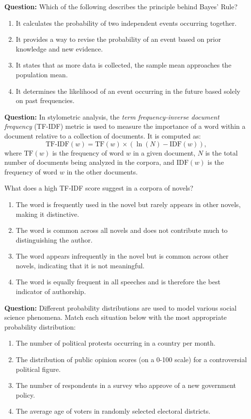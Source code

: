\documentclass[12pt]{article}
\begin{document}
\textbf{Question:}  
Which of the following describes the principle behind Bayes’ Rule?  
\begin{enumerate}
    \item[(A)] It calculates the probability of two independent events occurring together.  
    \item[(B)] It provides a way to revise the probability of an event based on prior knowledge and new evidence.  
    \item[(C)] It states that as more data is collected, the sample mean approaches the population mean.  
    \item[(D)] It determines the likelihood of an event occurring in the future based solely on past frequencies.  
\end{enumerate}

\textbf{Question:}  
In stylometric analysis, the \textit{term frequency-inverse document frequency} (TF-IDF) metric is used to measure the importance of a word within a document relative to a collection of documents. It is computed as:
\[
\text{TF-IDF}(w) = \text{TF}(w) \times (\ln(N) - \text{IDF}(w)),
\]
where \( \text{TF}(w) \) is the frequency of word \( w \) in a given document, $N$ is the total number of documents being analyzed in the corpora, and \( \text{IDF}(w) \) is the frequency of word $w$ in the other documents.  

What does a high TF-IDF score suggest in a corpora of novels?  
\begin{enumerate}
    \item[(A)] The word is frequently used in the novel but rarely appears in other novels, making it distinctive.  
    \item[(B)] The word is common across all novels and does not contribute much to distinguishing the author.  
    \item[(C)] The word appears infrequently in the novel but is common across other novels, indicating that it is not meaningful.  
    \item[(D)] The word is equally frequent in all speeches and is therefore the best indicator of authorship.  
\end{enumerate}

\textbf{Question:}  
Different probability distributions are used to model various social science phenomena. Match each situation below with the most appropriate probability distribution:  
\begin{enumerate}
    \item[(A)] The number of political protests occurring in a country per month.  
    \item[(B)] The distribution of public opinion scores (on a 0-100 scale) for a controversial political figure.  
    \item[(C)] The number of respondents in a survey who approve of a new government policy.  
    \item[(D)] The average age of voters in randomly selected electoral districts.  
\end{enumerate}
\end{document}
